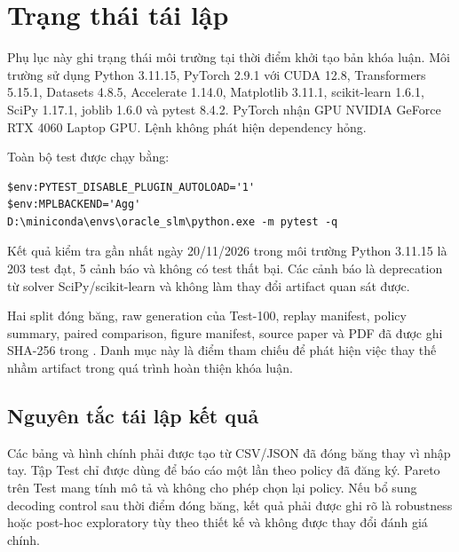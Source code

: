 \chapter{Trạng thái tái lập}
\label{app:reproducibility}

Phụ lục này ghi trạng thái môi trường tại thời điểm khởi tạo bản khóa luận. Môi
trường  sử dụng Python 3.11.15, PyTorch 2.9.1 với CUDA 12.8,
Transformers 5.15.1, Datasets 4.8.5, Accelerate 1.14.0, Matplotlib 3.11.1,
scikit-learn 1.6.1, SciPy 1.17.1, joblib 1.6.0 và pytest 8.4.2. PyTorch nhận GPU
NVIDIA GeForce RTX 4060 Laptop GPU. Lệnh  không phát
hiện dependency hỏng.

Toàn bộ test được chạy bằng:

\begin{verbatim}
$env:PYTEST_DISABLE_PLUGIN_AUTOLOAD='1'
$env:MPLBACKEND='Agg'
D:\miniconda\envs\oracle_slm\python.exe -m pytest -q
\end{verbatim}

Kết quả kiểm tra gần nhất ngày 20/11/2026 trong môi trường 
Python 3.11.15 là 203 test đạt, 5 cảnh báo và không có test thất bại. Các cảnh
báo là deprecation từ solver SciPy/scikit-learn và không làm thay đổi artifact
quan sát được.

Hai split đóng băng, raw generation của Test-100, replay manifest, policy
summary, paired comparison, figure manifest, source paper và PDF đã được ghi
SHA-256 trong . Danh
mục này là điểm tham chiếu để phát hiện việc thay thế nhầm artifact trong quá
trình hoàn thiện khóa luận.

\section{Nguyên tắc tái lập kết quả}

Các bảng và hình chính phải được tạo từ CSV/JSON đã đóng băng thay vì nhập tay.
Tập Test chỉ được dùng để báo cáo một lần theo policy đã đăng ký. Pareto trên
Test mang tính mô tả và không cho phép chọn lại policy. Nếu bổ sung decoding
control sau thời điểm đóng băng, kết quả phải được ghi rõ là robustness hoặc
post-hoc exploratory tùy theo thiết kế và không được thay đổi đánh giá chính.

